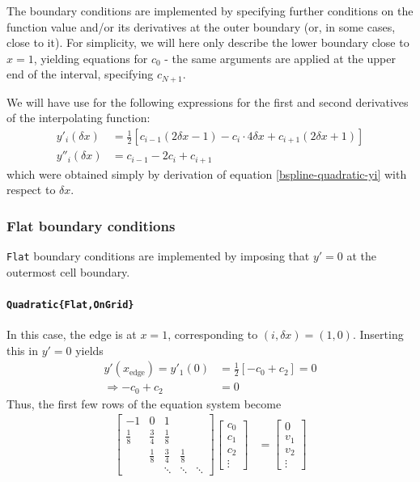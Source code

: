 \documentclass{article}
\begin{document}
The boundary conditions are implemented by specifying further conditions on the function value and/or its derivatives at the outer boundary (or, in some cases, close to it). For simplicity, we will here only describe the lower boundary close to $x = 1$, yielding equations for $c_0$ - the same arguments are applied at the upper end of the interval, specifying $c_{N+1}$.

We will have use for the following expressions for the first and second derivatives of the interpolating function:
\begin{align*}
y'_i(\delta x) &= \frac{1}{2}\left[c_{i-1}(2\delta x-1) - c_i \cdot 4\delta x + c_ {i+1} (2\delta x + 1)\right] \\
y''_i(\delta x) &= c_{i-1} - 2c_i + c_{i+1}
\end{align*}
which were obtained simply by derivation of equation \eqref{bspline-quadratic-yi} with respect to $\delta x$.

\subsubsection{Flat boundary conditions}

\texttt{Flat} boundary conditions are implemented by imposing that $y' = 0$ at the outermost cell boundary.

\paragraph{\texttt{Quadratic\{Flat,OnGrid\}}}
In this case, the edge is at $x=1$, corresponding to $(i,\delta x) = (1,0)$. Inserting this in $y'=0$ yields
\begin{align*}
y'(x_{\text{edge}}) = y'_1(0) &= \frac{1}{2}\left[-c_0 + c_2\right] = 0\\
\Rightarrow - c_0 + c_2 &= 0
\end{align*}
Thus, the first few rows of the equation system become
\begin{align*}
\begin{bmatrix} 
-1 & 0 & 1 \\
\frac{1}{8} & \frac{3}{4} & \frac{1}{8} \\
 & \frac{1}{8} & \frac{3}{4} & \frac{1}{8} \\
 & & \ddots & \ddots & \ddots
\end{bmatrix}
\begin{bmatrix}c_0\\ c_1\\ c_2\\\vdots\end{bmatrix}
&=
\begin{bmatrix}0\\ v_1 \\ v_2 \\\vdots\end{bmatrix}
\end{align*}
\end{document}
